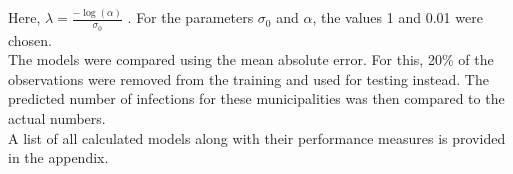 Here, $\lambda=\frac{-\log\left(\alpha\right)}{\sigma_0}$ \cite{martins2014penalising}.
For the parameters $\sigma_0$ and $\alpha$, the values 1 and 0.01 were chosen. \\
The models were compared using the mean absolute error. For this, 20\% of the observations were removed from the training and used for testing instead. The predicted number of infections for these municipalities was then compared to the actual numbers.
\\
A list of all calculated models along with their performance measures is provided in the appendix.
